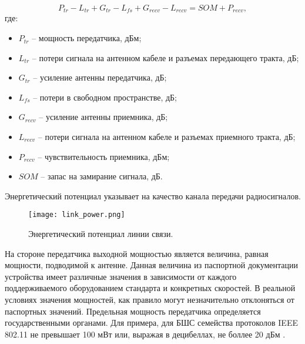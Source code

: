 

\begin{equation}
  \label{eq:part3_link_budget}
  P_{tr} - L_{tr} + G_{tr} - L_{fs} + G_{recv} - L_{recv} = SOM + P_{recv},
\end{equation}
где:

\begin{itemize}

  \item $P_{tr}$ -- мощность передатчика, дБм;

  \item $L_{tr}$ -- потери сигнала на антенном кабеле и разъемах передающего тракта, дБ;

  \item $G_{tr}$ -- усиление антенны передатчика, дБ;

  \item $L_{fs}$ -- потери в свободном пространстве, дБ;

  \item $G_{recv}$ -- усиление антенны приемника, дБ;

  \item $L_{recv}$ -- потери сигнала на антенном кабеле и разъемах приемного тракта, дБ;

  \item $P_{recv}$ -- чувствительность приемника, дБм;
  
  \item $SOM$ -- запас на замирание сигнала, дБ.

\end{itemize}
Энергетический потенциал указывает на качество канала передачи радиосигналов.

\begin{figure}[h!]
  \centering
   \texttt{[image: link\_power.png]}
\caption{Энергетический потенциал линии связи.}
\label{fig:link_power}
\end{figure}

На стороне передатчика выходной мощностью является величина, равная мощности, подводимой к антенне. Данная величина из паспортной документации устройства имеет различные значения в зависимости от каждого поддерживаемого оборудованием стандарта и конкретных скоростей. В реальной условиях значения мощностей, как правило могут незначительно отклоняться от паспортных значений. Предельная мощность передатчика определяется государственными органами. Для примера, для БШС семейства протоколов IEEE 802.11 не превышает 100 мВт или, выражая в децибеллах, не боллее 20 дБм \cite{GKRCh18_13}.


